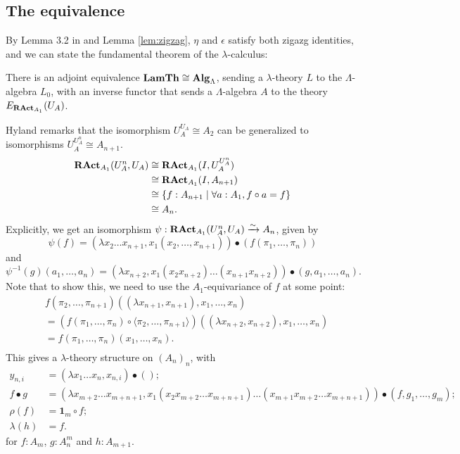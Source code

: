 \subsection{The equivalence}

By Lemma 3.2 in \cite{nlab:adjoint_equivalence} and Lemma \ref{lem:zigzag}, $ \eta $ and $ \epsilon $ satisfy both zigazg identities, and we can state the fundamental theorem of the $ \lambda $-calculus:
\begin{theorem}
  There is an adjoint equivalence $ \mathbf{LamTh} \cong \mathbf{Alg}_{\Lambda} $, sending a $ \lambda $-theory $ L $ to the $ \Lambda $-algebra $ L_0 $, with an inverse functor that sends a $ \Lambda $-algebra $ A $ to the theory $ E_{\mathbf{RAct}_{A_1}}(U_A) $.
\end{theorem}

\begin{remark}
  Hyland remarks that the isomorphism $ U_A^{U_A} \cong A_2 $ can be generalized to isomorphisms $ U_A^{U_A^n} \cong A_{n + 1} $.
  \begin{align*}
    \mathbf{RAct}_{A_1}(U_A^n, U_A)
    &\cong \mathbf{RAct}_{A_1}(I, U_A^{U_A^n})\\
    &\cong \mathbf{RAct}_{A_1}(I, A_{n + 1})\\
    &\cong \{ f : A_{n + 1} \mid \forall a : A_1, f \circ a = f \}\\
    &\cong A_n.
  \end{align*}
  Explicitly, we get an isomorphism $ \psi: \mathbf{RAct}_{A_1}(U_A^n, U_A) \xrightarrow \sim A_n $, given by
  \[ \psi(f) = (\lambda x_2 \dots x_{n + 1}, x_1 (x_2, \dots, x_{n + 1})) \bullet (f (\pi_1, \dots, \pi_n)) \]
  and
  \[ \psi^{-1}(g)(a_1, \dots, a_n) = (\lambda x_{n + 2}, x_1 (x_2 x_{n + 2}) \dots (x_{n + 1} x_{n + 2})) \bullet (g, a_1, \dots, a_n). \]
  Note that to show this, we need to use the $ A_1 $-equivariance of $ f $ at some point:
  \begin{align*}
    &f(\pi_2, \dots, \pi_{n + 1})((\lambda x_{n + 1}, x_{n + 1}), x_1, \dots, x_n)\\
    &= (f(\pi_1, \dots, \pi_n) \circ \langle \pi_2, \dots, \pi_{n + 1} \rangle) ((\lambda x_{n + 2}, x_{n + 2}), x_1, \dots, x_n)\\
    &= f(\pi_1, \dots, \pi_n) (x_1, \dots, x_n).\\
  \end{align*}
  This gives a $ \lambda $-theory structure on $ (A_n)_n $, with
  \begin{align*}
    y_{n, i} &= (\lambda x_1 \dots x_n, x_{n, i}) \bullet ();\\
    f \bullet g &= (\lambda x_{m + 2} \dots x_{m + n + 1}, x_1 (x_2 x_{m + 2} \dots x_{m + n + 1}) \dots (x_{m + 1} x_{m + 2} \dots x_{m + n + 1})) \bullet (f, g_1, \dots, g_m);\\
    \rho(f) &= \mathbf 1_m \circ f;\\
    \lambda(h) &= f.
  \end{align*}
  for $ f: A_m $, $ g: A_n^m $ and $ h: A_{m + 1} $.


\end{remark}
